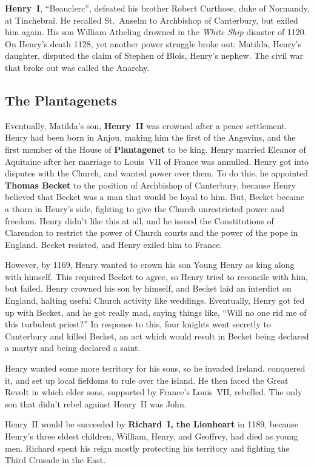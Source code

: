 \textbf{Henry~I}, ``Beauclerc'', defeated his brother Robert Curthose, duke of Normandy, at Tinchebrai.
He recalled St.\ Anselm to Archbishop of Canterbury, but exiled him again.
His son William Atheling drowned in the \textit{White Ship} disaster of 1120.
On Henry's death 1128, yet another power struggle broke out;
Matilda, Henry's daughter, disputed the claim of Stephen of Blois, Henry's nephew.
The civil war that broke out was called the Anarchy.

\subsection*{The Plantagenets}

Eventually, Matilda's son, \textbf{Henry~II} was crowned after a peace settlement.
Henry had been born in Anjou, making him the first of the Angevins,
and the first member of the House of \textbf{Plantagenet} to be king.
Henry married Eleanor of Aquitaine after her marriage to Louis~VII of France was annulled.
Henry got into disputes with the Church, and wanted power over them.
To do this, he appointed \textbf{Thomas Becket} to the position of Archbishop of Canterbury,
because Henry believed that Becket was a man that would be loyal to him.
But, Becket became a thorn in Henry's side, fighting to give the Church unrestricted power and freedom.
Henry didn't like this at all, and he issued the Constitutions of Clarendon
to restrict the power of Church courts and the power of the pope in England.
Becket resisted, and Henry exiled him to France.

However, by 1169, Henry wanted to crown his son Young Henry as king along with himself.
This required Becket to agree, so Henry tried to reconcile with him, but failed.
Henry crowned his son by himself, and Becket laid an interdict on England,
halting useful Church activity like weddings.
Eventually, Henry got fed up with Becket, and he got really mad, saying things like,
``Will no one rid me of this turbulent priest?''
In response to this, four knights went secretly to Canterbury and killed Becket,
an act which would result in Becket being declared a martyr and being declared a saint.

Henry wanted some more territory for his sons, so he invaded Ireland, conquered it,
and set up local fiefdoms to rule over the island.
He then faced the Great Revolt in which elder sons, supported by France's Louis~VII, rebelled.
The only son that didn't rebel against Henry~II was John.

Henry~II would be succeeded by \textbf{Richard~I, the Lionheart} in 1189,
because Henry's three eldest children, William, Henry, and Geoffrey, had died as young men.
Richard spent his reign mostly protecting his territory and fighting the Third Crusade in the East.


